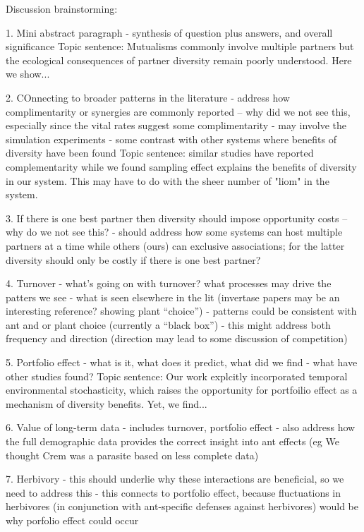 \documentclass[11pt]{article}
\begin{document}
Discussion brainstorming:

1. Mini abstract paragraph
- synthesis of question plus answers, and overall significance
Topic sentence: Mutualisms commonly involve multiple partners but the ecological consequences of partner diversity remain poorly understood. Here we show...

2. COnnecting to broader patterns in the literature
- address how complimentarity or synergies are commonly reported -- why did we not see this, especially since the vital rates suggest some complimentarity
- may involve the simulation experiments
- some contrast with other systems where benefits of diversity have been found
Topic sentence: similar studies have reported complementarity while we found sampling effect explains the benefits of diversity in our system. This may have to do with the sheer number of "liom" in the system.

3. If there is one best partner then diversity should impose opportunity costs -- why do we not see this?
- should address how some systems can host multiple partners at a time while others (ours) can exclusive associations; for the latter diversity should only be costly if there is one best partner?

4. Turnover
- what's going on with turnover? what processes may drive the patters we see
- what is seen elsewhere in the lit (invertase papers may be an interesting reference? showing plant ``choice'')
- patterns could be consistent with ant and or plant choice (currently a ``black box'')
- this might address both frequency and direction (direction may lead to some discussion of competition)

5.  Portfolio effect
- what is it, what does it predict, what did we find
- what have other studies found? 
Topic sentence: Our work explcitly incorporated temporal environmental stochasticity, which raises the opportunity for portfoilio effect as a mechanism of diversity benefits. Yet, we find...

6. Value of long-term data
- includes turnover, portfolio effect
- also address how the full demographic data provides the correct insight into ant effects (eg We thought Crem was a parasite based on less complete data)

7. Herbivory
- this should underlie why these interactions are beneficial, so we need to address this
- this connects to portfolio effect, because fluctuations in herbivores (in conjunction with ant-specific defenses against herbivores) would be why porfolio effect could occur
\end{document}
